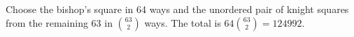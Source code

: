 Choose the bishop's square in 64 ways and the unordered pair of knight squares from the remaining 63 in $\binom{63}{2}$ ways. The total is $64\binom{63}{2}=\boxed{124992}$.
